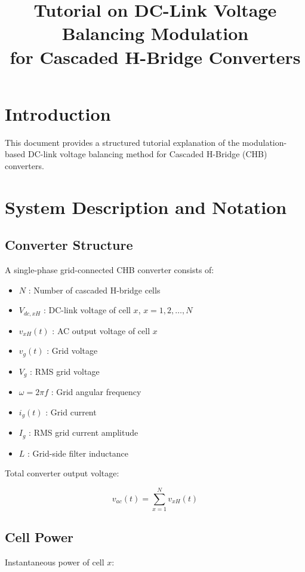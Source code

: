 \documentclass[11pt]{article}
\title{Tutorial on DC-Link Voltage Balancing Modulation\\
for Cascaded H-Bridge Converters}
\author{}
\date{}
\begin{document}
\maketitle

\section{Introduction}

This document provides a structured tutorial explanation of the modulation-based DC-link voltage balancing method for Cascaded H-Bridge (CHB) converters.

\section{System Description and Notation}

\subsection{Converter Structure}

A single-phase grid-connected CHB converter consists of:

\begin{itemize}
\item $N$ : Number of cascaded H-bridge cells
\item $V_{dc,xH}$ : DC-link voltage of cell $x$, $x = 1,2,\dots,N$
\item $v_{xH}(t)$ : AC output voltage of cell $x$
\item $v_g(t)$ : Grid voltage
\item $V_g$ : RMS grid voltage
\item $\omega = 2\pi f$ : Grid angular frequency
\item $i_g(t)$ : Grid current
\item $I_g$ : RMS grid current amplitude
\item $L$ : Grid-side filter inductance
\end{itemize}

Total converter output voltage:

\begin{equation}
v_{ac}(t) = \sum_{x=1}^{N} v_{xH}(t)
\end{equation}

\subsection{Cell Power}

Instantaneous power of cell $x$:
\end{document}
